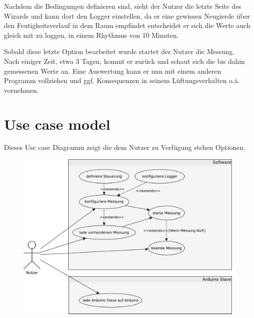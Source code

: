 Nachdem die Bedingungen definieren sind, sieht der Nutzer die letzte Seite des Wizards und kann dort den Logger einstellen, da er eine gewissen Neugierde über den Feutigkeitsverlauf in dem Raum empfindet entscheidet er sich die Werte auch gleich mit zu loggen, in einem Rhythmus von 10 Minuten. 

Sobald diese letzte Option bearbeitet wurde startet der Nutzer die Messung. Nach einiger Zeit, etwa 3 Tagen, kommt er zurück und schaut sich die bis dahin gemessenen Werte an. Eine Auswertung kann er nun mit einem anderen Programm vollziehen und ggf. Konsequenzen in seinem Lüftungsverhalten o.ä. vornehmen.
\section{Use case model}
Dieses Use case Diagramm zeigt die dem Nutzer zu Verfügung stehen Optionen.
\begin{figure}[H]
 \centering
 \includegraphics[width=\textwidth, keepaspectratio=true]{../Diagramme/BachelorUseCase1.pdf}
\end{figure}

